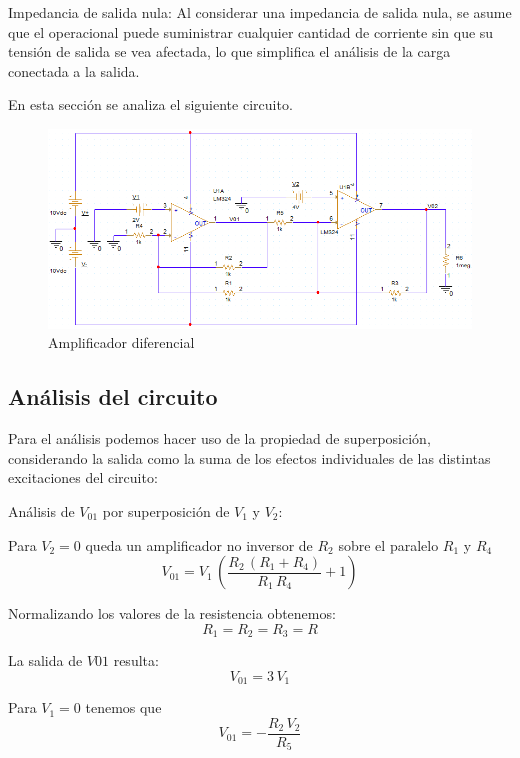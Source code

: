 \documentclass[12pt]{article}
\begin{document}
		Impedancia de salida nula: Al considerar una impedancia de salida nula, se asume que el operacional puede suministrar cualquier cantidad de corriente sin que su tensión de salida se vea afectada, lo que simplifica el análisis de la carga conectada a la salida.
		
		En esta sección se analiza el siguiente circuito.
		\begin{figure}[h!]
			\centering
			\includegraphics[width=1\linewidth]{Imagenes/cir1}
			\caption{Amplificador diferencial}
			\label{fig:cir1}
		\end{figure} \newpage
		
		\subsection{Análisis del circuito}
		Para el análisis podemos hacer uso de la propiedad de superposición, considerando la salida como la suma de los
		efectos individuales de las distintas excitaciones del circuito:
		
		Análisis de $V_{01}$ por superposición de $V_1$ y $V_2$:
		
		Para $V_2=0$ queda un amplificador no inversor de $R_2$ sobre el paralelo $R_1$ y $R_4$
		\begin{equation}
			V_{01} = V_1 \,{\left(\frac{R_2 \,{\left(R_1 +R_4 \right)}}{R_1 \,R_4 }+1\right)}
		\end{equation}
		
		Normalizando los valores de la resistencia obtenemos:
		\begin{equation}
			R_1=R_2=R_3=R 
		\end{equation}
		
		La salida de $V01$ resulta:
		\begin{equation}
			V_{01}=3\,V_1
		\end{equation}
		
		Para $V_1=0$ tenemos que
		\begin{equation}
			V_{01} = -\frac{R_2 \,V_2 }{R_5 }
		\end{equation}
		
\end{document}
